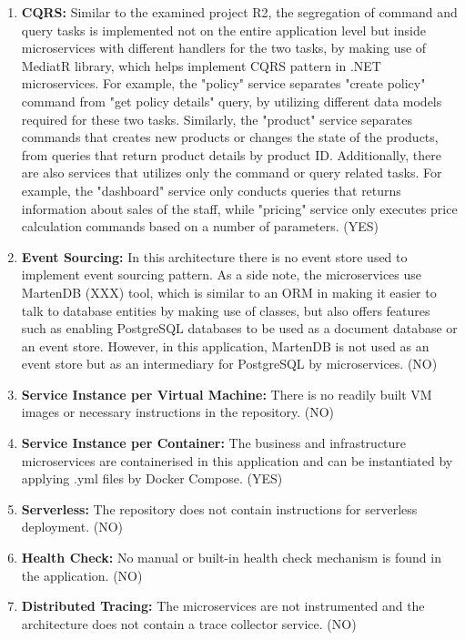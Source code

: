 \documentclass{Configuration_Files/PoliMi3i_thesis}
\begin{document}
\begin{enumerate}
    \item \textbf{CQRS:} Similar to the examined project R2, the segregation of command and query tasks is implemented not on the entire application level but inside microservices with different handlers for the two tasks, by making use of MediatR library, which helps implement CQRS pattern in .NET microservices.
    For example, the "policy" service separates "create policy" command from "get policy details" query, by utilizing different data models required for these two tasks.
    Similarly, the "product" service separates commands that creates new products or changes the state of the products, from queries that return product details by product ID.
    Additionally, there are also services that utilizes only the command or query related tasks.
    For example, the "dashboard" service only conducts queries that returns information about sales of the staff, while "pricing" service only executes price calculation commands based on a number of parameters. (YES)
    
    \item \textbf{Event Sourcing:} In this architecture there is no event store used to implement event sourcing pattern.
    As a side note, the microservices use MartenDB (XXX) tool, which is similar to an ORM in making it easier to talk to database entities by making use of classes, but also offers features such as enabling PostgreSQL databases to be used as a document database or an event store.
    However, in this application, MartenDB is not used as an event store but as an intermediary for PostgreSQL by microservices. (NO)
    
    \item \textbf{Service Instance per Virtual Machine:} There is no readily built VM images or necessary instructions in the repository. (NO)
    
    \item \textbf{Service Instance per Container:} The business and infrastructure microservices are containerised in this application and can be instantiated by applying .yml files by Docker Compose. (YES)
    
    \item \textbf{Serverless:} The repository does not contain instructions for serverless deployment. (NO)
    
    \item \textbf{Health Check:} No manual or built-in health check mechanism is found in the application. (NO)
    
    \item \textbf{Distributed Tracing:} The microservices are not instrumented and the architecture does not contain a trace collector service. (NO)
    

\end{enumerate}
\end{document}
